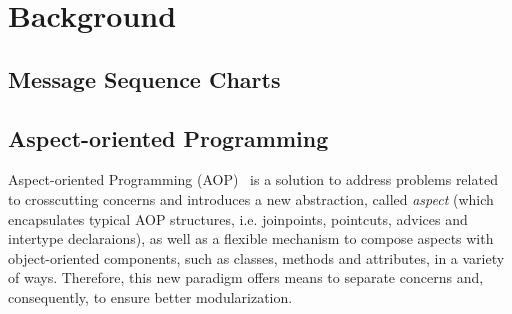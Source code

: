 \section{Background}

\subsection{Message Sequence Charts}


\subsection{Aspect-oriented Programming}

Aspect-oriented Programming (AOP)~\cite{Kiczales:2001} is a solution  to  address  problems  related  to  crosscutting  concerns   and   introduces   a   new   abstraction,   called   \textit{aspect} (which encapsulates typical AOP structures, i.e. joinpoints, pointcuts, advices and intertype declaraions),   as   well   as   a   flexible   mechanism   to   compose   aspects   with   object-oriented   components,   such  as  classes,  methods  and  attributes,  in  a  variety  of  ways.  Therefore,  this  new  paradigm  offers  means  to  separate  concerns  and,  consequently,  to  ensure  better  modularization.  %
